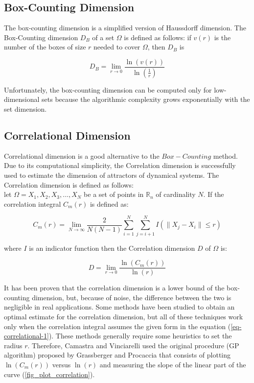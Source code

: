 \documentclass[journal]{IEEEtran}
\begin{document}
\subsection{Box-Counting Dimension}
The box-counting dimension is a simplified version of Haussdorff dimension. 
The Box-Counting dimension \(D_B\) of a set \(\Omega\) is defined as follows:
if \(v(r)\) is the number of the boxes of size \(r\) needed to cover \(\Omega\), then \(D_B\) is

\begin{equation}
  \label{eq-box-counting}
  D_B = \lim_{r\to 0}\frac{\ln(v(r))}{\ln(\frac{1}{r})}
\end{equation}

Unfortunately, the box-counting dimension can be computed only
for low-dimensional sets because the algorithmic complexity grows
exponentially with the set dimension.

\subsection{Correlational Dimension}

Correlational dimension is a good alternative to the \(Box-Counting\) method. Due to its computational simplicity, the Correlation dimension
is successfully used to estimate the dimension of attractors of dynamical systems.
The Correlation dimension is defined as follows:\\
let \(\Omega = X_1, X_2, X_3,...,X_N\)  be a set of points in \(\mathbb{R}_n\) of cardinality \(N\). 
If the correlation integral \(C_m(r)\) is defined as:


\begin{equation}
  \label{eq-correlational-1}
  C_m(r) = \lim_{N\to \infty}\frac{2}{N(N-1)}\sum_{i=1}^N\sum_{j=i+1}^N I(\parallel X_j - X_i \parallel \leq r) 
\end{equation}

where \(I\) is an indicator function then the Correlation dimension \(D\) of \(\Omega\) is:

\begin{equation}
  \label{eq-correlational-2}
  D = \lim_{r\to 0}\frac{\ln(C_m(r))}{\ln(r)}
\end{equation}

It has been proven \cite{Grassberger83} that the correlation dimension is a lower bound of the box-counting dimension, but, because of noise, 
the difference between the two is negligible in real applications.  
Some methods \cite{Smith92,Takens85} have been studied to obtain an optimal estimate for the correlation dimension, but all of these 
techniques work only when the correlation integral assumes the given form in the equation (\ref{eq-correlational-1}).
These methods generally require some heuristics to set the radius \(r\).
Therefore, Camastra and Vinciarelli \cite{CamastraVinciarelli02} used the original procedure (GP algorithm) proposed by Grassberger and Procaccia 
that consists of plotting \(\ln(C_m(r))\) versus \(\ln(r)\) and measuring the slope of the linear part of
the curve (\ref{fig_plot_correlation}).
\end{document}
